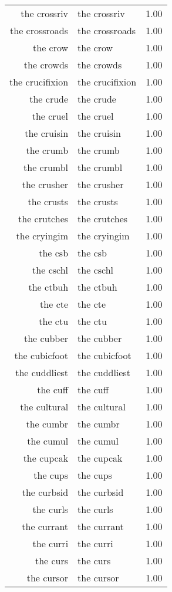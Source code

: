 \begin{table}[ht]
\begin{tabular}{rlr}
  the crossriv & the crossriv & 1.00 \\ 
  the crossroads & the crossroads & 1.00 \\ 
  the crow & the crow & 1.00 \\ 
  the crowds & the crowds & 1.00 \\ 
  the crucifixion & the crucifixion & 1.00 \\ 
  the crude & the crude & 1.00 \\ 
  the cruel & the cruel & 1.00 \\ 
  the cruisin & the cruisin & 1.00 \\ 
  the crumb & the crumb & 1.00 \\ 
  the crumbl & the crumbl & 1.00 \\ 
  the crusher & the crusher & 1.00 \\ 
  the crusts & the crusts & 1.00 \\ 
  the crutches & the crutches & 1.00 \\ 
  the cryingim & the cryingim & 1.00 \\ 
  the csb & the csb & 1.00 \\ 
  the cschl & the cschl & 1.00 \\ 
  the ctbuh & the ctbuh & 1.00 \\ 
  the cte & the cte & 1.00 \\ 
  the ctu & the ctu & 1.00 \\ 
  the cubber & the cubber & 1.00 \\ 
  the cubicfoot & the cubicfoot & 1.00 \\ 
  the cuddliest & the cuddliest & 1.00 \\ 
  the cuff & the cuff & 1.00 \\ 
  the cultural & the cultural & 1.00 \\ 
  the cumbr & the cumbr & 1.00 \\ 
  the cumul & the cumul & 1.00 \\ 
  the cupcak & the cupcak & 1.00 \\ 
  the cups & the cups & 1.00 \\ 
  the curbsid & the curbsid & 1.00 \\ 
  the curls & the curls & 1.00 \\ 
  the currant & the currant & 1.00 \\ 
  the curri & the curri & 1.00 \\ 
  the curs & the curs & 1.00 \\ 
  the cursor & the cursor & 1.00 \\ 

\end{tabular}
\end{table}
